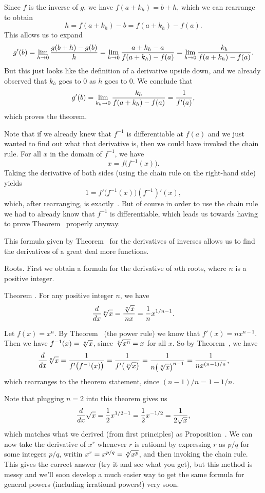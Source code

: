 Since $f$ is the inverse of $g$,
we have $f(a+k_h) = b+h$, which we can rearrange to obtain
$$ h = f(a+k_h) - b = f(a+k_h) - f(a).$$
This allows us to expand
$$
g'(b) = \lim_{h\to 0} { g(b+h) - g(b) \over h} 
= \lim_{h\to 0} { a+k_h - a\over f(a+k_h) - f(a) }
= \lim_{h\to 0} { k_h\over f(a+k_h) - f(a) }.
$$
But this just looks like the definition of a derivative upside down, and we already
observed that $k_h$ goes to $0$ as $h$ goes to $0$. We conclude that
$$g'(b) = \lim_{k_h\to 0} {k_h\over f(a+k_h) - f(a)} = {1\over f'(a)},$$
which proves the theorem.\slug

Note that if we already knew that $f^{-1}$ is differentiable at $f(a)$ and we just wanted to find out
what that derivative is, then we could have invoked the chain rule. For all $x$ in the domain of $f^{-1}$,
we have
$$x = f\bigl( f^{-1}(x)\bigr).$$
Taking the derivative of both sides (using the chain rule on the right-hand side) yields
$$1 = f'\bigl( f^{-1}(x)\bigr) (f^{-1})'(x),$$
which, after rearranging, is exactly~. But of course in order
to use the chain rule we had to already
know that $f^{-1}$ is differentiable, which leads us towards having to prove Theorem~{\thmderivinverse}
properly anyway.

This formula given by Theorem~{\thmderivinverse}
for the derivatives of inverses allows us to find the derivatives of a great deal more functions.

\medskip\boldlabel Roots. First we obtain a formula for the derivative of $n$th roots, where $n$ is a positive
integer.

\edef\thmrootrule{\the\thmcount}
\proclaim Theorem \advthm. For any positive integer $n$, we have
$${d\over dx} \root n\of x = {\root n\of x\over nx} = {1\over n} x^{1/n -1}.$$

\proof Let $f(x) = x^n$. By Theorem~{\thmpowerrule} (the power rule) we know that $f'(x) = nx^{n-1}$.
Then we have $f^{-1}(x) = \root n\of x$, since $\root n\of {x^n} = x$ for all $x$.
So by Theorem~{\thmderivinverse}, we have
$${d\over dx} \root n\of x = {1\over f'\bigl( f^{-1}(x) \bigr)}
= {1\over f'\bigl( \root n\of x \bigr)} = {1\over n \bigl(\root n\of x\bigr)^{n-1}} = {1\over n x^{(n-1)/n}},$$
which rearranges to the theorem statement, since $(n-1)/n = 1-1/n$.\slug

Note that plugging $n=2$ into this theorem gives us
$${d\over dx} \sqrt x = {1\over 2} x^{1/2-1} = {1\over 2} x^{-1/2} = {1\over 2\sqrt x},$$
which matches what we derived (from first principles) as Proposition~{\propsqrtderiv}. We can now take
the derivative of $x^r$ whenever $r$ is rational by expressing $r$ as $p/q$ for some integers $p/q$,
writin $x^r = x^{p/q} = \root q\of {x^p}$,
and then invoking the chain rule. This gives the correct answer (try it and see what you get), but
this method is messy and we'll soon develop a much easier
way to get the same formula for general powers (including irrational powers!) very soon.

